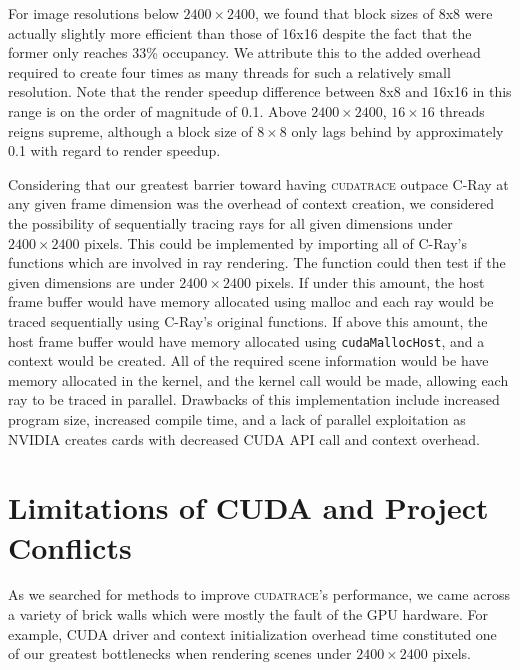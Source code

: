 \documentclass[12pt]{article}
\begin{document}
For image resolutions below $2400 \times 2400$, we found that block sizes of 8x8 were actually slightly more efficient than those of 16x16 despite the fact that the former only reaches 33\% occupancy. We attribute this to the added overhead required to create four times as many threads for such a relatively small resolution. Note that the render speedup difference between 8x8 and 16x16 in this range is on the order of magnitude of 0.1. Above $2400 \times 2400$, $16 \times 16$ threads reigns supreme, although a block size of $8 \times 8$ only lags behind by approximately 0.1 with regard to render speedup.

Considering that our greatest barrier toward having \textsc{cudatrace} outpace C-Ray at any given frame dimension was the overhead of context creation, we considered the possibility of sequentially tracing rays for all given dimensions under $2400 \times 2400$ pixels. This could be implemented by importing all of C-Ray’s functions which are involved in ray rendering. The function could then test if the given dimensions are under $2400 \times 2400$ pixels. If under this amount, the host frame buffer would have memory allocated using malloc and each ray would be traced sequentially using C-Ray’s original functions. If above this amount, the host frame buffer would have memory allocated using \texttt{cudaMallocHost}, and a context would be created. All of the required scene information would be have memory allocated in the kernel, and the kernel call would be made, allowing each ray to be traced in parallel. Drawbacks of this implementation include increased program size, increased compile time, and a lack of parallel exploitation as NVIDIA creates cards with decreased CUDA API call and context overhead. 


\section{Limitations of CUDA and Project Conflicts}

As we searched for methods to improve \textsc{cudatrace}’s performance, we came across a variety of brick walls which were mostly the fault of the GPU hardware. For example, CUDA driver and context initialization overhead time constituted one of our greatest bottlenecks when rendering scenes under $2400 \times 2400$ pixels. 
\end{document}
